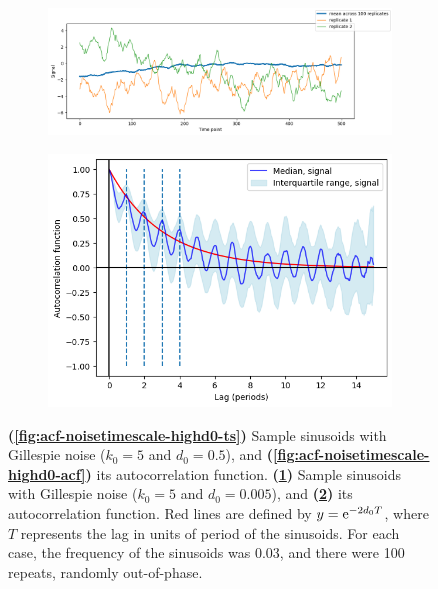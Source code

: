 \begin{figure}
  \begin{subfigure}[t]{0.6\textwidth}
  \centering
    \includegraphics[width=\linewidth]{gillespie_k5_d0p005_mean.png}
    \caption{
    }
    \label{fig:acf-noisetimescale-lowd0-ts}
  \end{subfigure}%
  \begin{subfigure}[t]{0.4\textwidth}
  \centering
    \includegraphics[width=\linewidth]{gillespie_k5_d0p005_acf.png}
    \caption{
    }
    \label{fig:acf-noisetimescale-lowd0-acf}
  \end{subfigure}

  \caption[
    Effect of death rate of Gillespie noise on the autocorrelation function.
  ]{
    \textbf{(\ref{fig:acf-noisetimescale-highd0-ts})} Sample sinusoids with Gillespie noise ($k_{0} = 5$ and $d_{0} = 0.5$), and 
    \textbf{(\ref{fig:acf-noisetimescale-highd0-acf})} its autocorrelation function.
    \textbf{(\ref{fig:acf-noisetimescale-lowd0-ts})} Sample sinusoids with Gillespie noise ($k_{0} = 5$ and $d_{0} = 0.005$), and 
    \textbf{(\ref{fig:acf-noisetimescale-lowd0-acf})} its autocorrelation function.
    Red lines are defined by $y = \mathrm{e}^{-2d_{0}T}$, where $T$ represents the lag in units of period of the sinusoids.
    For each case, the frequency of the sinusoids was 0.03, and there were 100 repeats, randomly out-of-phase.
  }
  \label{fig:acf-noisetimescale}
\end{figure}


